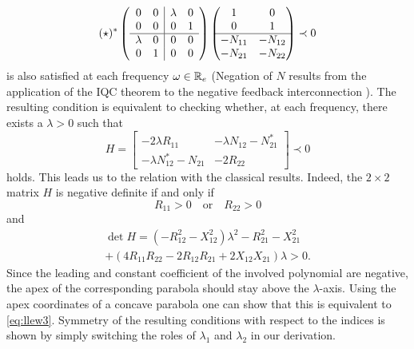 \begin{equation}
({\star})^*\left(\begin{array}{cc|cc}
      0&0  &\lambda &0 \\
      0&0  &0         &1\\ \hline
      \lambda &0 &0 &0\\
      0 &1 &0 &0
\end{array}\right)
\begin{pmatrix}1 &0\\0 &1\\\hline-N_{11} &-N_{12}\\-N_{21} &-N_{22}\end{pmatrix} \prec 0
\label{eq:LlewellynFDI}
\end{equation}
is also satisfied at each frequency $\omega\in\mathbb{R}_e$ (Negation of $N$ 
results from the application of the IQC theorem to the negative feedback 
interconnection ). The resulting condition is equivalent 
to checking whether, at each frequency, there exists a $\lambda > 0$ such that
\[
H = \left[
\begin{array}{cc} - 2\lambda R_{11} &  -\lambda N_{12} - N^*_{21}\\ 
-\lambda N_{12}^* - N_{21} &-2R_{22} 
\end{array}
\right]\prec 0
\]
holds. This leads us to the relation with the classical results. Indeed, 
the $2\times 2$ matrix $H$ is negative definite if and only if
\[
R_{11} > 0 \quad \text{or} \quad R_{22} > 0
\]
and
\begin{multline*}
\det H =  \left(-R_{12}^2 - X_{12}^2\right)\lambda^2 - R_{21}^2 - X_{21}^2 \\ + \left(4R_{11}R_{22} - 2R_{12}R_{21} + 2X_{12}X_{21}\right)\lambda  > 0.
\end{multline*}
Since the leading and constant coefficient of the involved polynomial are negative, 
the apex of the corresponding parabola should stay above the $\lambda$-axis. Using 
the apex coordinates of a concave parabola one can show that this is equivalent to 
\eqref{eq:llew3}. Symmetry of the resulting conditions with respect to the indices 
is shown by simply switching the roles of $\lambda_1$ and $\lambda_2$ in our derivation.

